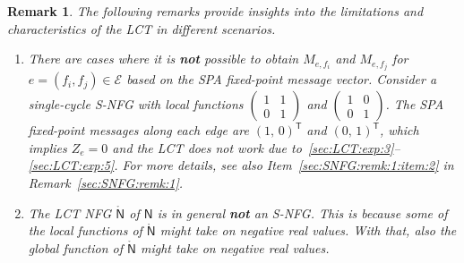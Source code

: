 \documentclass[journal]{IEEEtran}
\newtheorem{remark}[theorem]{Remark}
\newcommand{\setEfull}{ \mathcal{E} }
\newcommand{\tran}{\mathsf{T}}
\newcommand{\graphN}{ \mathsf{N} }
\newcommand{\LCT}[1]{ \mathring{#1} }
\newcommand{\efi}{ e,f_i }
\newcommand{\efj}{ e,f_j }
\begin{document}
\begin{remark}
  \label{sec:LCT:rem:1}
  The following remarks provide insights into the limitations and characteristics of the LCT in different scenarios.
  \begin{enumerate}
    \item There are cases where it is \textbf{not} possible to obtain
          $ M_{\efi} $ and $ M_{\efj} $ for $ e =(f_{i}, f_{j}) \in \setEfull $
          based on the SPA fixed-point message vector. Consider a single-cycle S-NFG
          with local functions $\left(\begin{smallmatrix} 1 & 1 \\ 0 & 1
            \end{smallmatrix}\right)$
          and
          $\left(\begin{smallmatrix}
              1 & 0 \\ 0 & 1
            \end{smallmatrix}\right)$. The SPA fixed-point messages along each edge are
          $\left(1,\, 0\right)^{\!\tran}$
          and
          $\left(0,\, 1\right)^{\!\tran}$,
          which implies
          $Z_e = 0 $ and the LCT does not work due to~\eqref{sec:LCT:exp:3}--\eqref{sec:LCT:exp:5}.
          For more details, see also Item~\ref{sec:SNFG:remk:1:item:2} in Remark~\ref{sec:SNFG:remk:1}.

    \item\label{remk: LCT on snfg results an NFG with negative fun nodes}  The LCT NFG $\LCT{\graphN}$ of $\graphN$ is in general \textbf{not} an S-NFG. This
          is because some of the local functions of $\LCT{\graphN}$ might take on
          negative real values. With that, also the global function of $\LCT{\graphN}$
          might take on negative real values.


\end{enumerate}
\end{remark}
\end{document}
